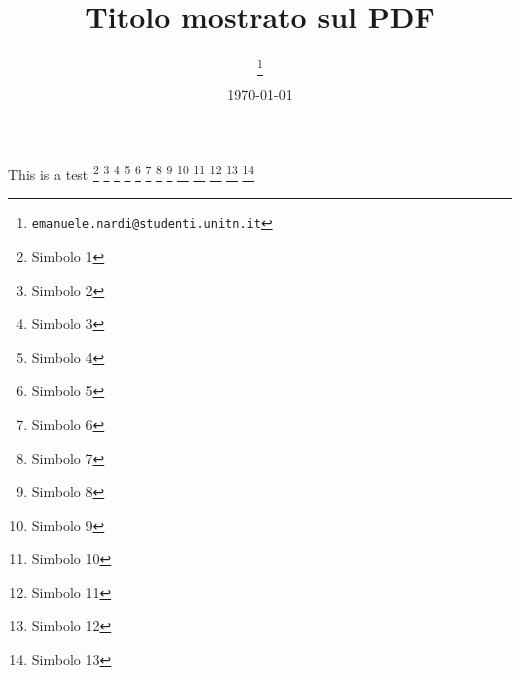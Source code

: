 \documentclass{article}
\title{Titolo mostrato sul PDF}
\author{
	\textbf{\Author}%
	\thanks{\texttt{emanuele.nardi@studenti.unitn.it}}
}
\date{\today}
\begin{document}
\maketitle

This is a test%
\footnote[1]{Simbolo 1}%
\footnote[2]{Simbolo 2}%
\footnote[3]{Simbolo 3}%
\footnote[4]{Simbolo 4}%
\footnote[5]{Simbolo 5}%
\footnote[6]{Simbolo 6}%
\footnote[7]{Simbolo 7}%
\footnote[8]{Simbolo 8}%
\footnote[9]{Simbolo 9}%
\footnote[10]{Simbolo 10}%
\footnote[11]{Simbolo 11}%
\footnote[12]{Simbolo 12}%
\footnote[13]{Simbolo 13}%
\end{document}
